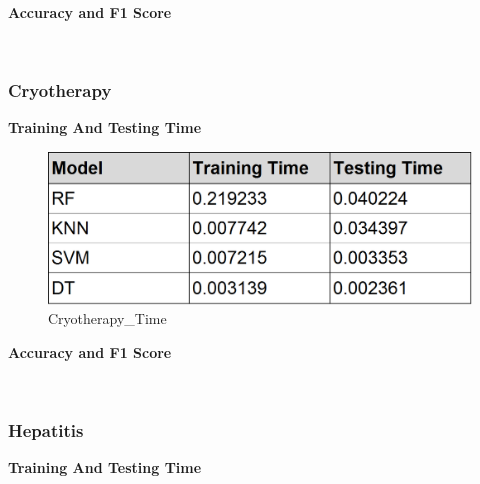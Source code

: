 \documentclass[11pt]{article}
\begin{document}
    \textbf{Accuracy and F1 Score}

    \begin{center}
    \end{center}
    { \hspace*{\fill} \\}
    
    \hypertarget{cryotherapy}{%
\subsubsection{Cryotherapy}\label{cryotherapy}}

    \textbf{Training And Testing Time}

    \begin{figure}
\centering
\includegraphics{images/Cryotherapy_Time.PNG}
\caption{Cryotherapy\_Time}
\end{figure}

    \textbf{Accuracy and F1 Score}

    \begin{center}
    \end{center}
    { \hspace*{\fill} \\}
    
    \hypertarget{hepatitis}{%
\subsubsection{Hepatitis}\label{hepatitis}}

    \textbf{Training And Testing Time}
\end{document}
